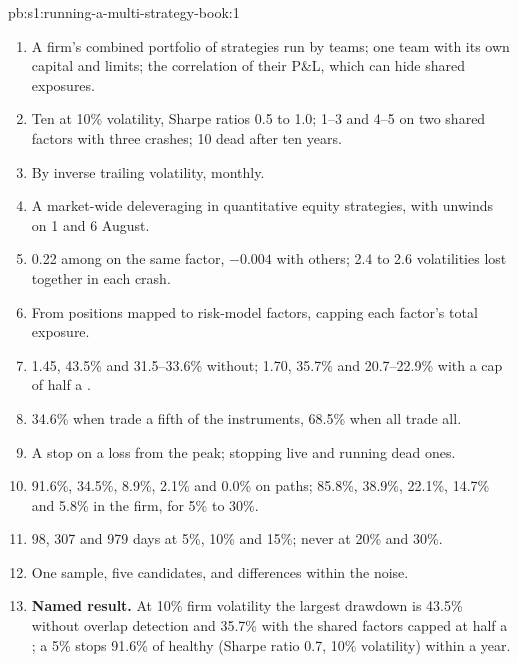 \begin{solution}{pb:s1:running-a-multi-strategy-book:1}
\begin{enumerate}
\item A firm's combined portfolio of strategies run by teams; one team with its own capital and limits; the correlation of their P\&L, which can hide
shared exposures.
\item Ten  at 10\% volatility, Sharpe ratios 0.5 to 1.0;  1--3 and 4--5 on two shared factors with three crashes;  10 dead after ten years.
\item By inverse trailing volatility, monthly.
\item A market-wide deleveraging in quantitative equity strategies, with unwinds on 1 and 6 August.
\item 0.22 among  on the same factor, $-0.004$ with others; 2.4 to 2.6 volatilities lost together in each crash.
\item From positions mapped to risk-model factors, capping each factor's total exposure.
\item 1.45, 43.5\% and 31.5--33.6\% without; 1.70, 35.7\% and 20.7--22.9\% with a cap of half a .
\item 34.6\% when  trade a fifth of the instruments, 68.5\% when all trade all.
\item A stop on a loss from the peak; stopping live  and running dead ones.
\item 91.6\%, 34.5\%, 8.9\%, 2.1\% and 0.0\% on paths; 85.8\%, 38.9\%, 22.1\%, 14.7\% and 5.8\% in the firm, for 5\% to 30\%.
\item 98, 307 and 979 days at 5\%, 10\% and 15\%; never at 20\% and 30\%.
\item One sample, five candidates, and differences within the noise.
\item \textbf{Named result.} At 10\% firm volatility the largest drawdown is 43.5\% without overlap detection and 35.7\% with the shared factors capped
at half a ; a 5\%  stops 91.6\% of healthy  (Sharpe ratio 0.7, 10\% volatility) within a year.

\end{enumerate}
\end{solution}

